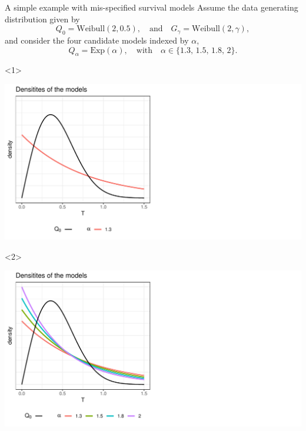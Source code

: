 \documentclass[smaller]{beamer}\usepackage{listings}
\begin{document}
\begin{frame}[label={sec:org529add1}]{A simple example with mis-specified survival models}
\small Assume the data generating distribution given by
\begin{equation*}
  Q_0 = \text{Weibull}(2,  0.5),
  \quad \text{and} \quad
  G_{\gamma} = \text{Weibull}(2,\gamma),
\end{equation*}
and consider the four candidate models indexed by $\alpha$,
\begin{equation*}
  Q_{\alpha} = \text{Exp}(\alpha),
  \quad \text{with} \quad 
  \alpha \in \{1.3, \,1.5,\, 1.8,\, 2\}.
\end{equation*}

\vfill

\begin{onlyenv}<1>
\begin{center}
\includegraphics[width=.9\linewidth]{fig-mix-const-v1.pdf}
\end{center}
\end{onlyenv}

\begin{onlyenv}<2>
\begin{center}
\includegraphics[width=.9\linewidth]{fig-mix-const-v2.pdf}
\end{center}
\end{onlyenv}


\end{frame}
\end{document}

